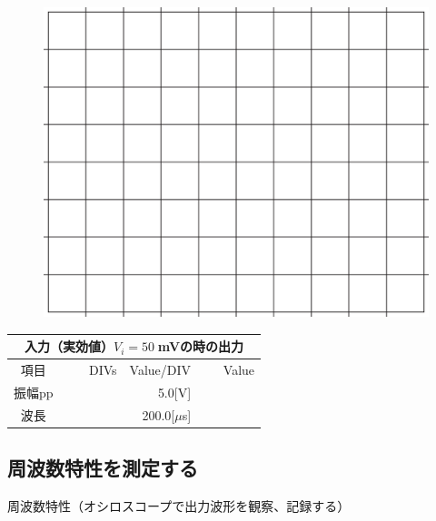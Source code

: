 \documentclass[uplatex,a4paper,11pt,oneside,openany]{jsbook}
\begin{document}
\begin{multicols}{2}
  \begin{figure}[H]
     \centering
      \includegraphics[keepaspectratio, scale=0.28, angle=0]
                  {figs/eps/grid.eps}
                  \label{fig:grid50mV}
  \end{figure}

  \begin{spacing}{1.5}
  \begin{tabular}{|c||r|r|r|}
    \multicolumn{4}{c}{入力（実効値）$V_i=50\;$mVの時の出力} \\ \hline
    項目 & DIVs & Value/DIV & Value \\ \hline \hline
    振幅pp & 　　　　 & 5.0[V]& 　　　　 \\ \hline
    波長 & 　　　　 & 200.0[$\mu$s]& 　　　　 \\ \hline
  \end{tabular}
\end{spacing}
\end{multicols}

\vfill
\newpage

\subsection{周波数特性を測定する}

周波数特性（オシロスコープで出力波形を観察、記録する）
\end{document}
